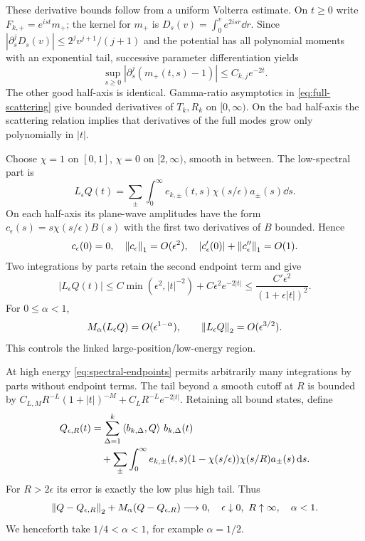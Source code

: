 These derivative bounds follow from a uniform Volterra estimate. On
$t\ge0$ write $F_{k,+}=e^{ist}m_+$; the kernel for $m_+$ is
$D_s(v)=\int_0^ve^{2isr}\dd r$. Since
$|\partial_s^jD_s(v)|\le2^jv^{j+1}/(j+1)$ and the potential has all
polynomial moments with an exponential tail, successive parameter
differentiation yields
\begin{equation}
 \sup_{s\ge0}|\partial_s^j(m_+(t,s)-1)|\le C_{k,j}e^{-2t}.
 \label{eq:jost-remainder}
\end{equation}
The other good half-axis is identical. Gamma-ratio asymptotics in
\eqref{eq:full-scattering} give bounded derivatives of $T_k,R_k$ on
$[0,\infty)$. On the bad half-axis the scattering relation implies that
derivatives of the full modes grow only polynomially in $|t|$.

Choose $\chi=1$ on $[0,1]$, $\chi=0$ on $[2,\infty)$, smooth in between.
The low-spectral part is
\begin{equation}
 L_\epsilon Q(t)=\sum_\pm\int_0^\infty
 e_{k,\pm}(t,s)\chi(s/\epsilon)a_\pm(s)\dd s.
\end{equation}
On each half-axis its plane-wave amplitudes have the form
$c_\epsilon(s)=s\chi(s/\epsilon)B(s)$ with the first two derivatives of
$B$ bounded. Hence
\begin{equation}
 c_\epsilon(0)=0,\quad \left\lVert c_\epsilon\right\rVert_1=O(\epsilon^2),\quad
 |c_\epsilon'(0)|+\left\lVert c_\epsilon''\right\rVert_1=O(1).
\end{equation}
Two integrations by parts retain the second endpoint term and give
\begin{equation}
 |L_\epsilon Q(t)|\le C\min(\epsilon^2,|t|^{-2})+
 C\epsilon^2e^{-2|t|}
 \le\frac{C'\epsilon^2}{(1+\epsilon|t|)^2}.
\end{equation}
For $0\le\alpha<1$,
\begin{equation}
 M_\alpha(L_\epsilon Q)=O(\epsilon^{1-\alpha}),\qquad
 \left\lVert L_\epsilon Q\right\rVert_2=O(\epsilon^{3/2}).
 \label{eq:low-cutoff}
\end{equation}
This controls the linked large-position/low-energy region.

At high energy \eqref{eq:spectral-endpoints} permits arbitrarily many
integrations by parts without endpoint terms. The tail beyond a smooth
cutoff at $R$ is bounded by
$C_{L,M}R^{-L}(1+|t|)^{-M}+C_LR^{-L}e^{-2|t|}$.
Retaining all bound states, define
\begin{align}
 Q_{\epsilon,R}(t)
 &=\sum_{\Delta=1}^k\left\langle b_{k,\Delta},Q\right\rangle\,b_{k,\Delta}(t)\notag\\
 &\quad+\sum_\pm\int_0^\infty e_{k,\pm}(t,s)
 (1-\chi(s/\epsilon))\chi(s/R)a_\pm(s)\mathop{}\!\mathrm d s.
\end{align}
For $R>2\epsilon$ its error is exactly the low plus high tail. Thus
\begin{equation}
 \left\lVert Q-Q_{\epsilon,R}\right\rVert_2+M_\alpha(Q-Q_{\epsilon,R})\longrightarrow0,
 \quad \epsilon\downarrow0,\ R\uparrow\infty,\quad \alpha<1.
 \label{eq:weighted-spectral-core}
\end{equation}
We henceforth take $1/4<\alpha<1$, for example $\alpha=1/2$.

